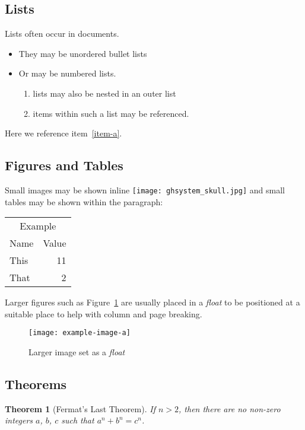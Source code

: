 \documentclass[a4paper,twocolumn]{article}
\newtheorem{theorem}{Theorem}
\providecommand\tagpdfsetup[1]{}
\begin{document}
\subsection{Lists}
Lists often occur in documents.
\begin{itemize}
\item They may be unordered bullet lists
\item Or may be numbered lists.
  \begin{enumerate}
  \item lists may also be nested in an outer list
  \item \label{item-a}items within such a list may be referenced.
  \end{enumerate}
\end{itemize}
Here we reference item~\ref{item-a}.

\subsection{Figures and Tables}

Small images may be shown inline
\texttt{[image: ghsystem\_skull.jpg]}
and small tables may be shown within the paragraph:
\begin{center}
\tagpdfsetup{table/header-rows={1,2}}
\begin{tabular}{lr}
\multicolumn{2}{c}{Example}\\
Name&Value\\
This& 11 \\
That & 2
\end{tabular}
\end{center}

Larger
figures such as Figure~\ref{float} are usually placed in a
\emph{float} to be positioned at a suitable place to help with column
and page breaking.
\begin{figure}
  \centering
  \texttt{[image: example-image-a]}
  \caption{\label{float}Larger image set as a \emph{float}}
\end{figure}

\subsection{Theorems}

\begin{theorem}[Fermat's Last Theorem]
If $n>2$, then there are no non-zero integers
$a$, $b$, $c$ such that $a^n+b^n=c^n$.
\end{theorem}
\end{document}
